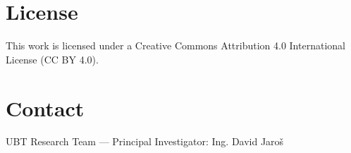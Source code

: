 \documentclass[12pt, a4paper]{article}
\begin{document}
\vfill

\section*{License}
This work is licensed under a Creative Commons Attribution 4.0 International License (CC BY 4.0).

\section*{Contact}
UBT Research Team — Principal Investigator: Ing. David Jaroš
\end{document}
